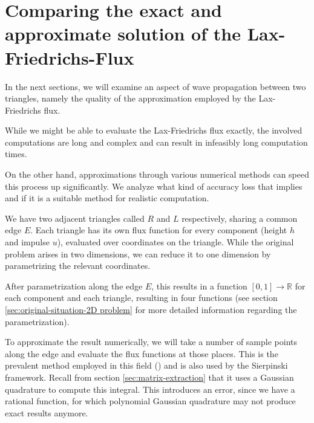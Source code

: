 \documentclass{article}
\newcommand{\reals}{\mathbb{R}}
\begin{document}


\newpage
\part{Comparing the exact and approximate solution of the Lax-\-Friedrichs-\-Flux}
\label{part:polynomial-comparison}

In the next sections, we will examine an aspect of wave propagation between two triangles, namely the quality of the approximation employed by the Lax-Friedrichs flux.

While we might be able to evaluate the Lax-Friedrichs flux exactly, the involved computations are long and complex and can result in infeasibly long computation times.

On the other hand, approximations through various numerical methods can speed this process up significantly. We analyze what kind of accuracy loss that implies and if it is a suitable method for realistic computation.

We have two adjacent triangles called $R$ and $L$ respectively, sharing a common edge $E$. Each triangle has its own flux function for every component (height $h$ and impulse $u$), evaluated over coordinates on the triangle. While the original problem arises in two dimensions, we can reduce it to one dimension by parametrizing the relevant coordinates.

After parametrization along the edge $E$, this results in a function $[0,1]\rightarrow\reals$ for each component and each triangle, resulting in four functions (see section \ref{sec:original-situation-2D problem} for more detailed information regarding the parametrization).

To approximate the result numerically, we will take a number of sample points along the edge and evaluate the flux functions at those places. This is the prevalent method employed in this field (\cite{castro07high-order-ader-fv-dg-numerical-methods,schwaiger08adaptive}) and is also used by the Sierpinski framework. Recall from section \ref{sec:matrix-extraction} that it uses a Gaussian quadrature to compute this integral. This introduces an error, since we have a rational function, for which polynomial Gaussian quadrature may not produce exact results anymore.
\end{document}
